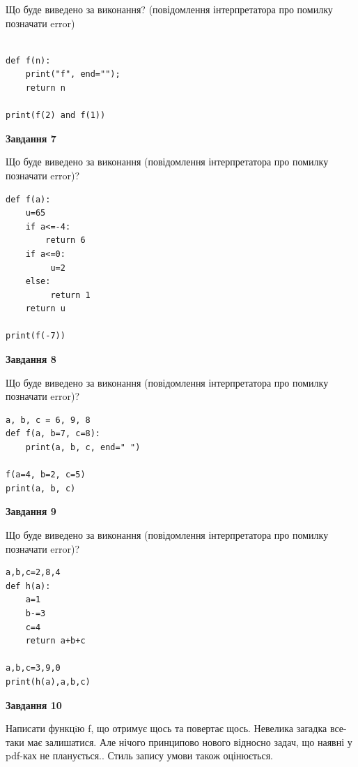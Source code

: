 \documentclass[12pt, ukrainian]{article}
\begin{document}
{\begin {large}
Що буде виведено за виконання? (повідомлення інтерпретатора про помилку позначати error)\par
\begin{verbatim}

def f(n):
    print("f", end="");
    return n

print(f(2) and f(1))
\end{verbatim}

{\begin {center}\textbf{Завдання 7}\end {center}}

Що буде виведено за виконання (повідомлення інтерпретатора про помилку позначати error)?\par
\begin{verbatim}
def f(a):
    u=65
    if a<=-4: 
        return 6
    if a<=0:
         u=2
    else:
         return 1
    return u

print(f(-7))
\end{verbatim}

{\begin {center}\textbf{Завдання 8}\end {center}}

Що буде виведено за виконання (повідомлення інтерпретатора про помилку позначати error)?\par
\begin{verbatim}
a, b, c = 6, 9, 8
def f(a, b=7, c=8):
    print(a, b, c, end=" ")

f(a=4, b=2, c=5)
print(a, b, c)
\end{verbatim}

{\begin {center}\textbf{Завдання 9}\end {center}}

Що буде виведено за виконання (повідомлення інтерпретатора про помилку позначати error)?\par
\begin{verbatim}
a,b,c=2,8,4
def h(a):
    a=1
    b-=3
    c=4
    return a+b+c

a,b,c=3,9,0
print(h(a),a,b,c)
\end{verbatim}

{\begin {center}\textbf{Завдання 10}\end {center}}


Написати функцiю f, що отримує щось та повертає щось. Невелика загадка все-таки має залишатися. Але нічого принципово нового відносно задач, що наявні у pdf-ках не планується.. Стиль запису умови також оцінюється.\par
\end {large}}
\newpage
\end{document}
